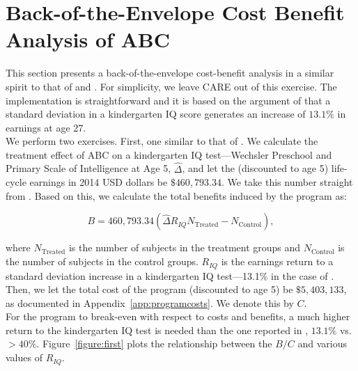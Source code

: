 
\section{Back-of-the-Envelope Cost Benefit Analysis of ABC} \label{appendix:back}

\noindent This section presents a back-of-the-envelope cost-benefit analysis in a similar spirit to that of \citet{Chetty_Friedman_etal_2010_HowDoesYour} and \citet{Kline-Walters_2015_NBER-Evaluating}. For simplicity, we leave CARE out of this exercise. The implementation is straightforward and it is based on the argument of  \citet{Chetty_Friedman_etal_2010_HowDoesYour} that a standard deviation in a kindergarten IQ score generates an increase of $13.1\%$ in earnings at age 27.\\

\noindent We perform two exercises. First, one similar to that of \citet{Kline-Walters_2015_NBER-Evaluating}. We calculate the treatment effect of ABC on a kindergarten IQ test---Wechsler Preschool and Primary Scale of Intelligence at Age 5, $\widehat{\Delta}$, and let the (discounted to age 5) life-cycle earnings in 2014 USD dollars be $\$460,793.34$. We take this number straight from \citet{Kline-Walters_2015_NBER-Evaluating}. Based on this, we calculate the total benefits induced by the program as: 

\begin{equation}
B = 460,793.34 \left( \widehat{\Delta} R_{IQ}  N_{\text{Treated}}  -  N_{\text{Control}} \right) , 
\end{equation}

\noindent where $N_{\text{Treated}}$ is the number of subjects in the treatment groups and $N_{\text{Control}}$ is the number of subjects in the control groups. $R_{IQ}$ is the earnings return to a standard deviation increase in a kindergarten IQ test---13.1\% in the case of \citep{Chetty_Friedman_etal_2010_HowDoesYour}. Then, we let the total cost of the program (discounted to age 5) be $\$5,403,133$, as documented in Appendix~\ref{app:programcosts}. We denote this by $C$.\\ 

\noindent For the program to break-even with respect to costs and benefits, a much higher return to the kindergarten IQ test is needed than the one reported in \citep{Chetty_Friedman_etal_2010_HowDoesYour}, $13.1\%$ vs. $ > 40\%$. Figure~\ref{figure:first} plots the relationship between the $B/C$ and various values of $R_{IQ}$.\\ 

